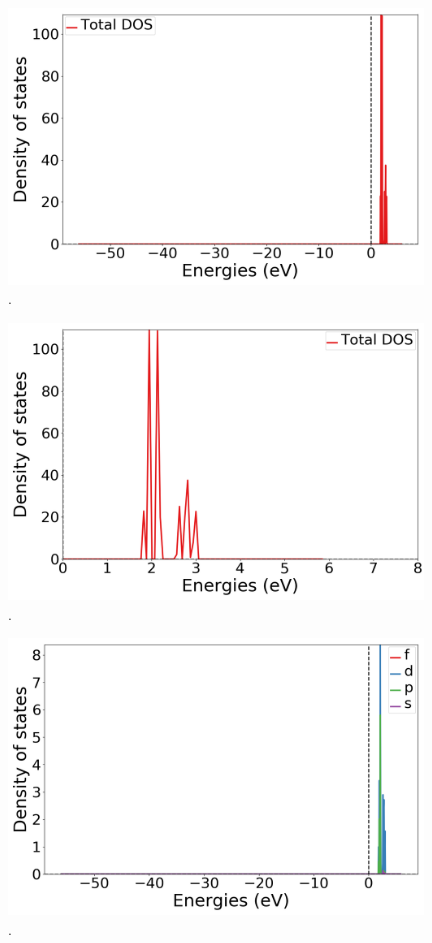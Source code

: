 \documentclass{article}
\begin{document}
  \begin{figure}[H]
      \centering
      \includegraphics[width = 11cm]{../fig/Yb_k4_TDOS_1.png}
      \caption{. }
      \label{fig:Yb_k4_TDOS_1.png}
  \end{figure}

  \begin{figure}[H]
      \centering
      \includegraphics[width = 11cm]{../fig/Yb_k4_TDOS_2.png}
      \caption{. }
      \label{fig:Yb_k4_TDOS_2.png}
  \end{figure}

  \begin{figure}[H]
      \centering
      \includegraphics[width = 11cm]{../fig/Yb_k4_LDOS25_1.png}
      \caption{. }
      \label{fig:Yb_k4_LDOS25_1.png}
  \end{figure}
\end{document}
